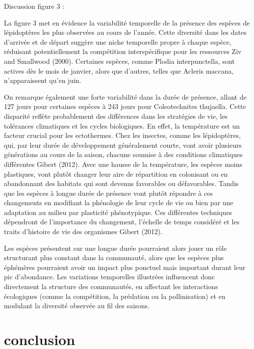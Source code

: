 \documentclass[9pt,twocolumn,twoside,]{pnas-new}
\begin{document}
Discussion figure 3 :

La figure 3 met en évidence la variabilité temporelle de la présence des
espèces de lépidoptères les plus observées au cours de l'année. Cette
diversité dans les dates d'arrivée et de départ suggère une niche
temporelle propre à chaque espèce, réduisant potentiellement la
compétition interspécifique pour les ressources Ziv and Smallwood
(2000). Certaines espèces, comme Plodia interpunctella, sont actives dès
le mois de janvier, alors que d'autres, telles que Acleris maccana,
n'apparaissent qu'en juin.

On remarque également une forte variabilité dans la durée de présence,
allant de 127 jours pour certaines espèces à 243 jours pour
Coleotechnites thujaella. Cette disparité reflète probablement des
différences dans les stratégies de vie, les tolérances climatiques et
les cycles biologiques. En effet, la température est un facteur crucial
pour les ectothermes. Chez les insectes, comme les lépidoptères, qui,
par leur durée de développement généralement courte, vont avoir
plusieurs générations au cours de la saison, chacune soumise à des
conditions climatiques différentes Gibert (2012). Avec une hausse de la
température, les espèces moins plastiques, vont plutôt changer leur aire
de répartition en colonisant ou en abandonnant des habitats qui sont
devenus favorables ou défavorables. Tandis que les espèces à longue
durée de présence vont plutôt répondre à ces changements en modifiant la
phénologie de leur cycle de vie ou bien par une adaptation au milieu par
plasticité phénotypique. Ces différentes techniques dépendront de
l'importance du changement, l'échelle de temps considéré et les traits
d'histoire de vie des organismes Gibert (2012).

Les espèces présentent sur une longue durée pourraient alors jouer un
rôle structurant plus constant dans la communauté, alors que les espèces
plus éphémères pourraient avoir un impact plus ponctuel mais important
durant leur pic d'abondance. Les variations temporelles illustrées
influencent donc directement la structure des communautés, en affectant
les interactions écologiques (comme la compétition, la prédation ou la
pollinisation) et en modulant la diversité observée au fil des saisons.

\section*{conclusion}\label{conclusion}
\end{document}
